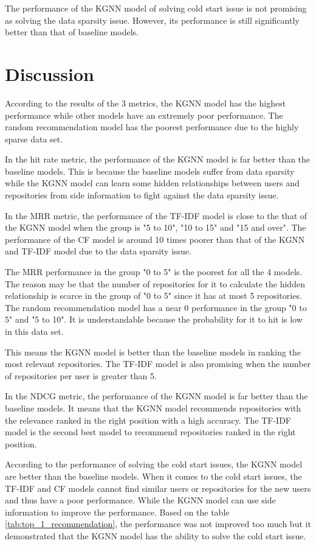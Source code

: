 \documentclass[11pt,twoside]{report}
\begin{document}
The performance of the KGNN model of solving cold start issue is not promising as solving the data sparsity issue. However, its performance is still significantly better than that of baseline models.

\section{Discussion}
According to the results of the 3 metrics, the KGNN model has the highest performance while other models have an extremely poor performance. The random recommendation model has the poorest performance due to the highly sparse data set.

In the hit rate metric, the performance of the KGNN model is far better than the baseline models. This is because the baseline models suffer from data sparsity while the KGNN model can learn some hidden relationships between users and repositories from side information to fight against the data sparsity issue.

In the MRR metric, the performance of the TF-IDF model is close to the that of the KGNN model when the group is "5 to 10", "10 to 15" and "15 and over". The performance of the CF model is around 10 times poorer than that of the KGNN and TF-IDF model due to the data sparsity issue.

The MRR performance in the group "0 to 5" is the poorest for all the 4 models. The reason may be that the number of repositories for it to calculate the hidden relationship is scarce in the group of "0 to 5" since it has at most 5 repositories. The random recommendation model has a near 0 performance in the group "0 to 5" and "5 to 10". It is understandable because the probability for it to hit is low in this data set.

This means the KGNN model is better than the baseline models in ranking the most relevant repositories. The TF-IDF model is also promising when the number of repositories per user is greater than 5.

In the NDCG metric, the performance of the KGNN model is far better than the baseline models. It means that the KGNN model recommends repositories with the relevance ranked in the right position with a high accuracy. The TF-IDF model is the second best model to recommend repositories ranked in the right position.

According to the performance of solving the cold start issues, the KGNN model are better than the baseline models. When it comes to the cold start issues, the TF-IDF and CF models cannot find similar users or repositories for the new users and thus have a poor performance. While the KGNN model can use side information to improve the performance. Based on the table \ref{tab:top_1_recommendation}, the performance was not improved too much but it demonstrated that the KGNN model has the ability to solve the cold start issue.
\end{document}
